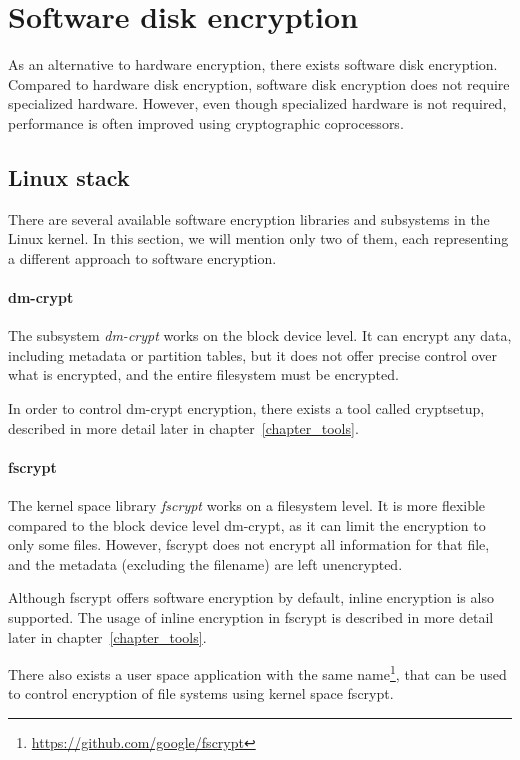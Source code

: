 \section{Software disk encryption}

As an alternative to hardware encryption, there exists software disk encryption. Compared to hardware disk encryption, software disk encryption does not require specialized hardware.
However, even though specialized hardware is not required, performance is often improved using cryptographic coprocessors.


\subsection{Linux stack}

There are several available software encryption libraries and subsystems in the Linux kernel. 
In this section, we will mention only two of them, each representing a different approach to software encryption.


\paragraph{dm-crypt}

The subsystem \emph{dm-crypt} works on the block device level. It can encrypt any data, including metadata or partition tables, but it does not offer precise control over what is encrypted, and the entire filesystem must be encrypted. 

In order to control dm-crypt encryption, there exists a tool called cryptsetup, described in more detail later in chapter~\ref{chapter_tools}.


\paragraph{fscrypt}

The kernel space library \emph{fscrypt} works on a filesystem level.
It is more flexible compared to the block device level dm-crypt, as it can limit the encryption to only some files. However, fscrypt does not encrypt all information for that file, and the metadata (excluding the filename) are left unencrypted.

Although fscrypt offers software encryption by default, inline encryption is also supported.
The usage of inline encryption in fscrypt is described in more detail later in chapter~\ref{chapter_tools}.

There also exists a user space application with the same name\footnote{\url{https://github.com/google/fscrypt}}, that can be used to control encryption of file systems using kernel space fscrypt.

